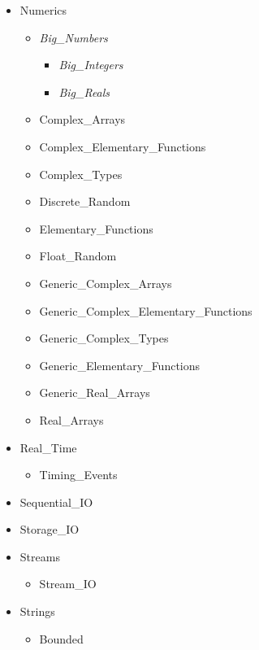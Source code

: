 \documentclass[english]{article}
\begin{document}
\begin{scriptsize}
\begin{multicols*}{5}
\begin{itemize}[leftmargin=0mm]
\begin{itemize}[leftmargin=5mm]
      \item[] Numerics
         \begin{itemize}[leftmargin=5mm]
            \item[] \textit{Big\_Numbers}
               \begin{itemize}[leftmargin=5mm]
                  \item[] \textit{Big\_Integers}
                  \item[] \textit{Big\_Reals}
               \end{itemize}
            \item[] Complex\_Arrays
            \item[] Complex\_Elementary\_Functions
            \item[] Complex\_Types
            \item[] Discrete\_Random
            \item[] Elementary\_Functions
            \item[] Float\_Random
            \item[] Generic\_Complex\_Arrays
            \item[] Generic\_Complex\_Elementary\_Functions
            \item[] Generic\_Complex\_Types
            \item[] Generic\_Elementary\_Functions
            \item[] Generic\_Real\_Arrays
            \item[] Real\_Arrays
         \end{itemize}
      \item[] Real\_Time
         \begin{itemize}[leftmargin=5mm]
            \item[] Timing\_Events
         \end{itemize}
      \item[] Sequential\_IO
      \item[] Storage\_IO
      \item[] Streams
         \begin{itemize}[leftmargin=5mm]
            \item[] Stream\_IO
         \end{itemize}
      \item[] Strings
         \begin{itemize}[leftmargin=5mm]
            \item[] Bounded
               \begin{itemize}[leftmargin=5mm]

\end{itemize}
\end{itemize}
\end{itemize}
\end{itemize}
\end{multicols*}
\end{scriptsize}
\end{document}
